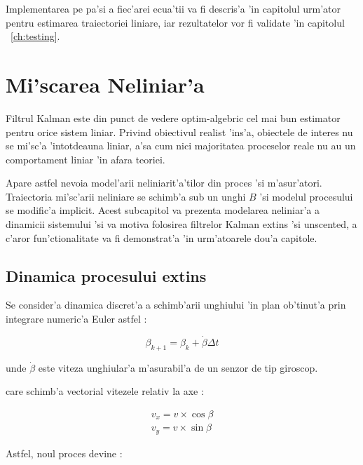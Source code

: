 \documentclass[12pt,a4paper,twoside]{report}
\begin{document}
Implementarea pe pa'si a fiec'arei ecua'tii va fi descris'a 'in capitolul urm'ator pentru estimarea traiectoriei liniare, iar rezultatelor vor fi validate 'in capitolul ~\ref{ch:testing}.

\section{Mi'scarea Neliniar'a}

Filtrul Kalman este din punct de vedere optim-algebric cel mai bun estimator pentru orice sistem liniar. Privind obiectivul realist 'ins'a, obiectele de interes nu se mi'sc'a 'intotdeauna liniar, a'sa cum nici majoritatea proceselor reale nu au un comportament liniar 'in afara teoriei. 

\vspace{5px}

Apare astfel nevoia model'arii neliniarit'a'tilor din proces 'si m'asur'atori. Traiectoria mi'sc'arii neliniare se schimb'a sub un unghi $B$ 'si modelul procesului se modific'a implicit. Acest subcapitol va prezenta modelarea neliniar'a a dinamicii sistemului 'si va motiva folosirea filtrelor Kalman extins 'si unscented, a c'aror fun'ctionalitate va fi demonstrat'a 'in urm'atoarele dou'a capitole. 

\subsection{Dinamica procesului extins}

Se consider'a dinamica discret'a a schimb'arii unghiului 'in plan ob'tinut'a prin integrare numeric'a Euler astfel \cite{7334442}:

\begin{equation}
  \beta_{k+1} = \beta_{k} + \dot \beta \Delta t
\end{equation}

unde $\dot \beta$ este viteza unghiular'a m'asurabil'a de un senzor de tip giroscop.

\vspace{5px}

care schimb'a vectorial vitezele relativ la axe \cite{lidar}:

\begin{gather}
    v_x = v  \times \cos{\beta} \\ 
    v_y = v  \times \sin{\beta}
\end{gather}

Astfel, noul proces devine \cite{5164334} \cite{lidar}:
\end{document}
